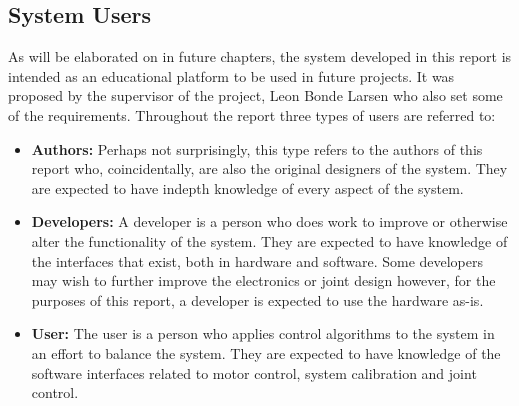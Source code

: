 \subsection{System Users} %
\label{sub:system_users}
As will be elaborated on in future chapters, the system developed in this report is intended as an educational platform to be used in future projects.
It was proposed by the supervisor of the project, Leon Bonde Larsen who also set some of the requirements.
Throughout the report three types of users are referred to:
\begin{itemize}
	\item \textbf{Authors:} Perhaps not surprisingly, this type refers to the authors of this report who, coincidentally, are also the original designers of the system.
	They are expected to have indepth knowledge of every aspect of the system.
	\item \textbf{Developers:} A developer is a person who does work to improve or otherwise alter the functionality of the system.
	They are expected to have knowledge of the interfaces that exist, both in hardware and software.
	Some developers may wish to further improve the electronics or joint design however, for the purposes of this report, a developer is expected to use the hardware as-is.
	\item \textbf{User:} The user is a person who applies control algorithms to the system in an effort to balance the system.
	They are expected to have knowledge of the software interfaces related to motor control, system calibration and joint control.
\end{itemize}

